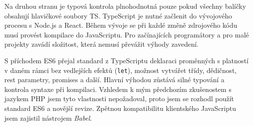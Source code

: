 Na druhou stranu je typová kontrola plnohodnotná pouze pokud všechny balíčky obsahují hlavičkové soubory TS. TypeScript je nutné začlenit do vývojového procesu s Node.js a React. Během vývoje se při každé změně zdrojového kódu musí provést kompilace do JavaScriptu. Pro začínajících programátory a pro malé projekty zavádí složitost, která nemusí převážit výhody zavedení.

S příchodem ES6 přejal standard z TypeScriptu deklaraci proměnných s platností v daném rámci bez vedlejších efektů (\texttt{let}), možnost vytvářet třídy, dědičnost, rest parametry, promises a další. Hlavní výhodou zůstává silné typování a kontrola syntaxe při kompilaci. Vzhledem k mým předchozím zkušenostem s jazykem PHP jsem tyto vlastnosti nepožadoval, proto jsem se rozhodl použít standard ES6 a novější revize. Zpětnou kompatibilitu klientského JavaScriptu jsem zajistil nástrojem \textit{Babel}.

